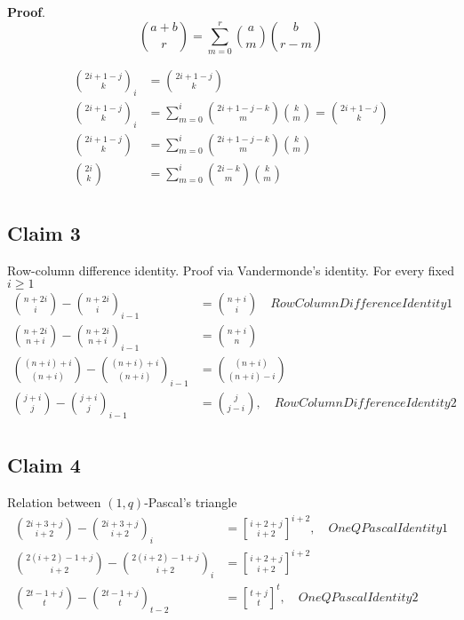 \documentclass[12pt,letterpaper,oneside,reqno]{amsart}
\newcommand \rascalNumber [3] {\binom{#1}{#2}_{#3}}
\newcommand{\genstirlingI}[3]{%
    \genfrac{[}{]}{0pt}{#1}{#2}{#3}%
}
\newcommand{\oneQBinomial}[3]{\genstirlingI{}{#1}{#2}^{#3}}
\numberwithin{equation}{section}
\begin{document}
\textbf{Proof}.
\begin{equation*}
    \binom{a+b}{r} = \sum_{m=0}^{r} \binom{a}{m} \binom{b}{r-m}
\end{equation*}

\begin{align*}
    \rascalNumber{2i+1-j}{k}{i} &= \binom{2i+1-j}{k} \\
    \rascalNumber{2i+1-j}{k}{i} &= \sum_{m=0}^{i} \binom{2i+1-j-k}{m} \binom{k}{m} = \binom{2i+1-j}{k} \\
    \binom{2i+1-j}{k}           &= \sum_{m=0}^{i} \binom{2i+1-j-k}{m} \binom{k}{m}  \\
    \binom{2i}{k}               &= \sum_{m=0}^{i} \binom{2i-k}{m} \binom{k}{m}  \\
\end{align*}

\subsection{Claim 3} Row-column difference identity.
Proof via Vandermonde's identity.
For every fixed $i \geq 1$
\begin{align*}
    \binom{n+2i}{i} - \rascalNumber{n+2i}{i}{i-1} &= \binom{n+i}{i} \quad RowColumnDifferenceIdentity1 \\
    \binom{n+2i}{n+i} - \rascalNumber{n+2i}{n+i}{i-1} &= \binom{n+i}{n} \\
    \binom{(n+i)+i}{(n+i)} - \rascalNumber{(n+i)+i}{(n+i)}{i-1} &= \binom{(n+i)}{(n+i)-i} \\
    \binom{j+i}{j} - \rascalNumber{j+i}{j}{i-1} &= \binom{j}{j-i}, \quad RowColumnDifferenceIdentity2 \\
\end{align*}

\subsection{Claim 4} Relation between $(1,q)$-Pascal's triangle
\begin{align*}
    \binom{2i+3+j}{i+2} - \rascalNumber{2i+3+j}{i+2}{i} &= \oneQBinomial{i+2+j}{i+2}{i+2}, \quad OneQPascalIdentity1 \\
    \binom{2(i+2)-1+j}{i+2} - \rascalNumber{2(i+2)-1+j}{i+2}{i} &= \oneQBinomial{i+2+j}{i+2}{i+2} \\
    \binom{2t-1+j}{t} - \rascalNumber{2t-1+j}{t}{t-2} &= \oneQBinomial{t+j}{t}{t}, \quad OneQPascalIdentity2 \\
\end{align*}
\end{document}
